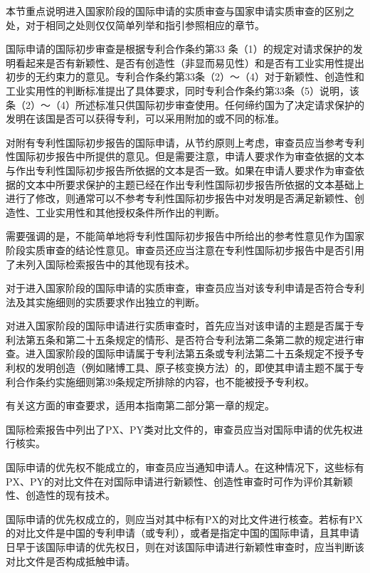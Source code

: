 本节重点说明进入国家阶段的国际申请的实质审查与国家申请实质审查的区别之处，对于相同之处则仅仅简单列举和指引参照相应的章节。

国际申请的国际初步审查是根据专利合作条约第33 条（1）的规定对请求保护的发明看起来是否有新颖性、是否有创造性（非显而易见性）和是否有工业实用性提出初步的无约束力的意见。专利合作条约第33条（2）～（4）对于新颖性、创造性和工业实用性的判断标准提出了具体要求，同时专利合作条约第33条（5）说明，该条（2）～（4）所述标准只供国际初步审查使用。任何缔约国为了决定请求保护的发明在该国是否可以获得专利，可以采用附加的或不同的标准。

对附有专利性国际初步报告的国际申请，从节约原则上考虑，审查员应当参考专利性国际初步报告中所提供的意见。但是需要注意，申请人要求作为审查依据的文本与作出专利性国际初步报告所依据的文本是否一致。如果在申请人要求作为审查依据的文本中所要求保护的主题已经在作出专利性国际初步报告所依据的文本基础上进行了修改，则通常可以不参考专利性国际初步报告中对发明是否满足新颖性、创造性、工业实用性和其他授权条件所作出的判断。

需要强调的是，不能简单地将专利性国际初步报告中所给出的参考性意见作为国家阶段实质审查的结论性意见。审查员还应当注意在专利性国际初步报告中是否引用了未列入国际检索报告中的其他现有技术。

对于进入国家阶段的国际申请的实质审查，审查员应当对该专利申请是否符合专利法及其实施细则的实质要求作出独立的判断。

对进入国家阶段的国际申请进行实质审查时，首先应当对该申请的主题是否属于专利法第五条和第二十五条规定的情形、是否符合专利法第二条第二款的规定进行审查。进入国家阶段的国际申请属于专利法第五条或专利法第二十五条规定不授予专利权的发明创造（例如赌博工具、原子核变换方法）的，即使其申请主题不属于专利合作条约实施细则第39条规定所排除的内容，也不能被授予专利权。

有关这方面的审查要求，适用本指南第二部分第一章的规定。

国际检索报告中列出了PX、PY类对比文件的，审查员应当对国际申请的优先权进行核实。

国际申请的优先权不能成立的，审查员应当通知申请人。在这种情况下，这些标有PX、PY的对比文件在对国际申请进行新颖性、创造性审查时可作为评价其新颖性、创造性的现有技术。

国际申请的优先权成立的，则应当对其中标有PX的对比文件进行核查。若标有PX的对比文件是中国的专利申请（或专利），或者是指定中国的国际申请，且其申请日早于该国际申请的优先权日，则在对该国际申请进行新颖性审查时，应当判断该对比文件是否构成抵触申请。

